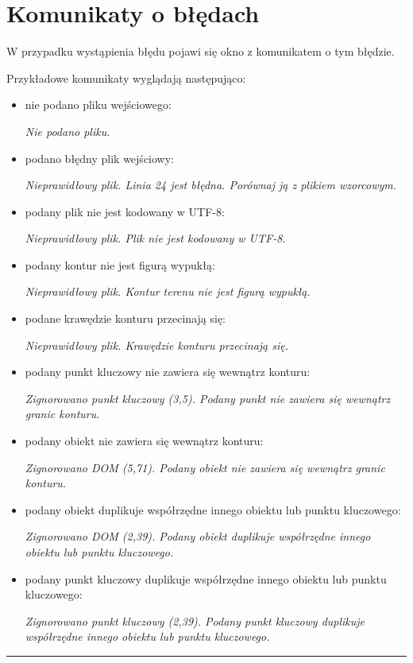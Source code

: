 \documentclass[a4paper,11pt]{article}
\newcommand{\linia}{\rule{\linewidth}{0.4mm}}
\begin{document}
\section{Komunikaty o błędach}
W przypadku wystąpienia błędu pojawi się okno z komunikatem o tym błędzie.

\noindent
Przykładowe komunikaty wyglądają następująco:
\begin{itemize}
\item nie podano pliku wejściowego:

\textit{Nie podano pliku.}
\item podano błędny plik wejściowy:

\textit{Nieprawidłowy plik. Linia 24 jest błędna. Porównaj ją z plikiem wzorcowym.}
\item podany plik nie jest kodowany w UTF-8:

\textit{Nieprawidłowy plik. Plik nie jest kodowany w UTF-8.}
\item podany kontur nie jest figurą wypukłą:

\textit{Nieprawidłowy plik. Kontur terenu nie jest figurą wypukłą.}
\item podane krawędzie konturu przecinają się:

\textit{Nieprawidłowy plik. Krawędzie konturu przecinają się.}
\item podany punkt kluczowy nie zawiera się wewnątrz konturu:

\textit{Zignorowano punkt kluczowy (3,5). Podany punkt nie zawiera się wewnątrz granic konturu.}
\item podany obiekt nie zawiera się wewnątrz konturu:

\textit{Zignorowano DOM (5,71). Podany obiekt nie zawiera się wewnątrz granic konturu.}
\item podany obiekt duplikuje współrzędne innego obiektu lub punktu kluczowego:

\textit{Zignorowano DOM (2,39). Podany obiekt duplikuje współrzędne innego obiektu lub punktu kluczowego.}
\item podany punkt kluczowy duplikuje współrzędne innego obiektu lub punktu kluczowego:

\textit{Zignorowano punkt kluczowy (2,39).  Podany punkt kluczowy duplikuje współrzędne innego obiektu lub punktu kluczowego.}

\end{itemize}

\noindent\linia
\end{document}
